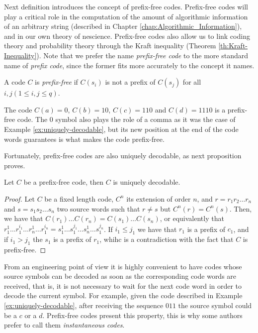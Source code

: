 Next definition introduces the concept of prefix-free codes. Prefix-free codes will play a critical role in the computation of the amount of algorithmic information of an arbitrary string (described in Chapter \ref{chap:Algorithmic_Information}), and in our own theory of nescience. Prefix-free codes also allow us to link coding theory and probability theory through the Kraft inequality (Theorem \ref{th:Kraft-Inequality}). Note that we prefer the name \emph{prefix-free code} to the more standard name of \emph{prefix code}, since the former fits more accurately to the concept it names.

\begin{definition}
\label{def:Prefix-free-Code}
A code $C$ is \emph{prefix-free} if $C(s_{i})$ is not a prefix of $C(s_{j})$ for all $i,j\left(1\leq i,j\leq q\right)$.
\end{definition}

\begin{example}
\label{ex:prefix-free}
The code $C(a)=0$, $C(b)=10$, $C(c)=110$ and $C(d)=1110$ is a prefix-free code. The $0$ symbol also plays the role of a comma as it was the case of Example \ref{ex:uniquely-decodable}, but its new position at the end of the code words guarantees is what makes the code prefix-free.
\end{example}

Fortunately, prefix-free codes are also uniquely decodable, as next proposition proves.

\begin{proposition}
Let $C$ be a prefix-free code, then $C$ is uniquely decodable.
\end{proposition}
\begin{proof}
Let $C$ be a fixed length code, $C^n$ its extension of order $n$, and $r = r_1 r_2 \ldots r_n$ and $s = s_1 s_2 \ldots s_n$ two source words such that $r \ne s$ but $C^n(r) = C^n(s)$. Then, we have that $C(r_1) \ldots C(r_n) = C(s_1) \ldots C(s_n)$, or equivalently that $r_1^1 \ldots r_1^{i_1} \ldots r_n^1 \ldots r_1^{i_n} = s_1^1 \ldots s_1^{j_1} \ldots s_n^1 \ldots s_1^{j_n}$. If $i_1 \leq j_1$ we have that $r_1$ is a prefix of $c_1$, and if $i_1 > j_1$ the $s_1$ is a prefix of $r_1$, whihc is a contradiction with the fact that $C$ is prefix-free.
\end{proof}

From an engineering point of view it is highly convenient to have codes whose source symbols can be decoded as soon as the corresponding code words are received, that is, it is not necessary to wait for the next code word in order to decode the current symbol. For example, given the code described in Example \ref{ex:uniquely-decodable}, after receiving the sequence $011$ the source symbol could be a $c$ or a $d$. Prefix-free codes present this property, this is why some authors prefer to call them \emph{instantaneous codes}.

